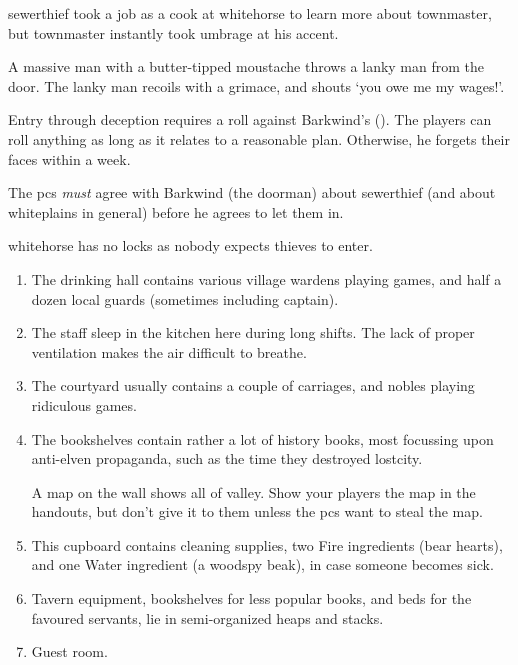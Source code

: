 \begin{multicols}{2}
\begin{exampletext}
  \Gls{sewerthief} took a job as a cook at \gls{whitehorse} to learn more about \gls{townmaster}, but \gls{townmaster} instantly took umbrage at his  accent.
\end{exampletext}

\begin{boxtext}
  A massive man with a butter-tipped moustache throws a lanky man from the door.
  The lanky man recoils with a grimace, and shouts `you owe me my wages!'.
\end{boxtext}


Entry through deception requires a roll against Barkwind's  (\tn).
The players can roll anything as long as it relates to a reasonable plan.
Otherwise, he forgets their faces within a week.

The \glspl{pc} \emph{must} agree with Barkwind (the doorman) about \gls{sewerthief} (and about \gls{whiteplains} in general) before he agrees to let them in.

\Gls{whitehorse} has no locks as nobody expects thieves to enter.
 
\begin{enumerate}
  \item
  The drinking hall contains various \gls{village} \glspl{warden} playing games, and half a dozen local guards (sometimes including \gls{captain}).
  \label{horseHall}
  \item
  \label{horseKitch}
  The staff sleep in the kitchen here during long shifts.
  The lack of proper ventilation makes the air difficult to breathe.
  \item
  \label{horseYard}
  The courtyard usually contains a couple of carriages, and nobles playing ridiculous games.
  \item
  \label{horseUpstairs}
  The bookshelves contain rather a lot of history books, most focussing upon anti-elven propaganda, such as the time they destroyed \gls{lostcity}.

  A map on the wall shows all of \gls{valley}.
  Show your players the map in the handouts, but don't give it to them unless the \glspl{pc} want to steal the map.
  \item
  \label{horseCupboard}
  This cupboard contains cleaning supplies, two Fire \glspl{ingredient} (bear hearts), and one Water \gls{ingredient} (a woodspy beak), in case someone becomes sick.
  \item
  \label{horseSideRoom}
  Tavern equipment, bookshelves for less popular books, and beds for the favoured servants, lie in semi-organized heaps and stacks.
  \item
  \label{wolfRoom}
  Guest room.
\end{enumerate}


\end{multicols}
